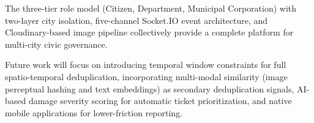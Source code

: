 \documentclass[conference]{IEEEtran}
\begin{document}
The three-tier role model (Citizen, Department, Municipal Corporation) with two-layer city isolation, five-channel Socket.IO event architecture, and Cloudinary-based image pipeline collectively provide a complete platform for multi-city civic governance.

Future work will focus on introducing temporal window constraints for full spatio-temporal deduplication, incorporating multi-modal similarity (image perceptual hashing and text embeddings) as secondary deduplication signals, AI-based damage severity scoring for automatic ticket prioritization, and native mobile applications for lower-friction reporting.

\end{document}
